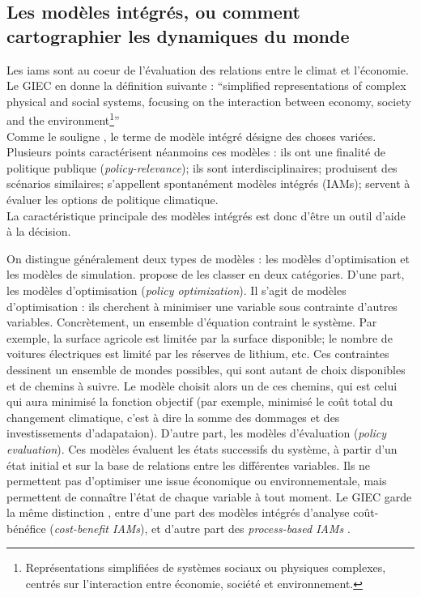 \subsection{Les modèles intégrés, ou comment cartographier les dynamiques du monde}
\label{sect:1.3.1}


Les \glspl{iam} sont au coeur de l'évaluation des relations entre le climat et l'économie. Le \Gls{GIEC} en donne la définition suivante : \enquote{{simplified representations of complex physical and social systems, focusing on the interaction between economy, society and the environment}\footnote{Représentations simplifiées de systèmes sociaux ou physiques complexes, centrés sur l'interaction entre économie, société et environnement.}}\\

Comme le souligne \textcite{cointe_organising_2019}, le terme de modèle intégré désigne des choses variées. Plusieurs points caractérisent néanmoins ces modèles : ils ont une finalité de politique publique (\emph{policy-relevance}); ils sont interdisciplinaires; produisent des scénarios similaires; s'appellent spontanément modèles intégrés (IAMs); servent à évaluer les options de politique climatique. \\

La caractéristique principale des modèles intégrés est donc d'être un outil d'aide à la décision. 

On distingue généralement deux types de modèles : les modèles d'optimisation et les modèles de simulation.  
\textcite{nordhaus_dice_2013} propose de les classer en deux catégories. D'une part, les modèles d'optimisation (\emph{policy optimization}). Il s'agit de modèles d'optimisation : ils cherchent à minimiser une variable sous contrainte d'autres variables. Concrètement, un ensemble d'équation contraint le système. Par exemple, la surface agricole est limitée par la surface disponible; le nombre de voitures électriques est limité par les réserves de lithium, etc. Ces contraintes dessinent un ensemble de mondes possibles, qui sont autant de choix disponibles et de chemins à suivre. Le modèle choisit alors un de ces chemins, qui est celui qui aura minimisé la fonction objectif (par exemple, minimisé le coût total du changement climatique, c'est à dire la somme des dommages et des investissements d'adapataion). D'autre part, les modèles d'évaluation (\emph{policy evaluation}). Ces modèles évaluent les états successifs du système, à partir d'un état initial et sur la base de relations entre les différentes variables. Ils ne permettent pas d'optimiser une issue économique ou environnementale, mais permettent de connaître l'état de chaque variable à tout moment. 
Le \Gls{GIEC} garde la même distinction , entre d'une part des modèles intégrés d'analyse coût-bénéfice (\emph{cost-benefit IAMs}), et d'autre part des \emph{process-based IAMs} \autocite{intergovernmental_panel_on_climate_change_ipcc_annex_2023}.



